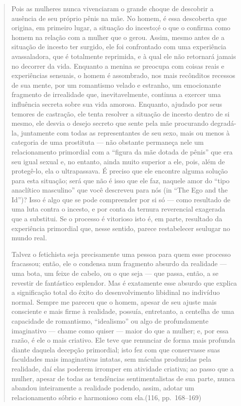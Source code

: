 \begin{quote}
Pois as mulheres nunca vivenciaram o grande choque de descobrir
a ausência de seu próprio pênis na mãe. No homem, é essa descoberta que
origina, em primeiro lugar, a situação do incesto;\idxinces[|(] é o que o confirma
como homem na relação com a mulher que o gerou. Assim, mesmo antes de a
situação de incesto ter surgido, ele foi confrontado com uma
experiência avassaladora, que é totalmente reprimida, e à qual ele não
retornará jamais no decorrer da vida. Enquanto a menina se preocupa
com coisas reais e experiências sensuais, o homem é assombrado, nos
mais recônditos recessos de sua mente, por um romantismo velado e
estranho, um emocionante fragmento de irrealidade que,
inevitavelmente, continua a exercer uma influência secreta sobre sua
vida amorosa. Enquanto, ajudado por seus temores de castração, ele
tenta resolver a situação de incesto dentro de si mesmo, ele desvia o
desejo secreto que sente pela mãe procurando degradá-la, juntamente
com todas as representantes de seu sexo, mais ou menos à categoria de
uma prostituta --- não obstante permaneça nele um relacionamento
primordial com a ``figura da mãe dotada de
pênis'' que era seu igual sexual e, no entanto, ainda
muito superior a ele, pois, além de protegê-lo, ela o ultrapassava. É
preciso que ele encontre alguma solução para esta situação; será que
não é isso que ele faz, naquele amor do ``tipo anaclítico
masculino'' que você descreveu para nós (in
``The Ego\idxfreudegoid{} and the Id'')? Isso é algo
que se pode compreender por si só --- como resultado de uma luta
contra o incesto, e por conta da ternura reverencial exagerada que a
substitui. Se o processo é vitorioso isto é, em parte, resultado da
experiência primordial que, nesse sentido, parece restabelecer seu\idxinces[|)]
lugar no mundo real.

Talvez o fetichista\idxfetic{} seja precisamente uma pessoa para quem esse
processo fracassou; então, ele o condensa num fragmento absurdo da
realidade --- uma bota, um feixe de cabelo, ou o que seja --- que
passa, então, a se revestir de fantástico esplendor. Mas é exatamente
esse absurdo que explica a significação total do êxito do
desenvolvimento libidinal no indivíduo normal. Sempre me pareceu que o
homem, apesar de seu ajuste mais consciente e mais firme à realidade,
possuía, entretanto, a centelha de uma capacidade de romantismo,
``idealismo'' ou algo de profundamente
imaginativo --- chame como quiser --- maior do que a mulher; e, por
essa razão, é ele o mais criativo.\idxcriavs{} Ele teve que renunciar de forma mais
profunda diante daquela decepção primordial; isto fez com que
conservasse suas faculdades mais imaginativas intatas, sem máculas
produzidas pela realidade, daí elas poderem irromper em atividade
criativa; ao passo que a mulher, apesar de todas as tendências
sentimentalistas de sua parte, nunca abandou inteiramente a realidade
podendo, assim, adotar um relacionamento sóbrio e harmonioso com ela.\idxconfe[|)]
(116, pp.~168--169)\idxsalome[|)]
\end{quote}

